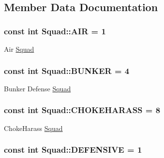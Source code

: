 \subsection{Member Data Documentation}
\hypertarget{class_squad_ad33fd78a46d5a68af5d9b36c2faf2620}{
\subsubsection[{A\-I\-R}]{\setlength{\rightskip}{0pt plus 5cm}const int Squad\-::\-A\-I\-R = 1\hspace{0.3cm}{\ttfamily [static]}}}\label{class_squad_ad33fd78a46d5a68af5d9b36c2faf2620}
Air \hyperlink{class_squad}{Squad} \hypertarget{class_squad_acbf1c634b1d198828b8badb96039c1a0}{
\subsubsection[{B\-U\-N\-K\-E\-R}]{\setlength{\rightskip}{0pt plus 5cm}const int Squad\-::\-B\-U\-N\-K\-E\-R = 4\hspace{0.3cm}{\ttfamily [static]}}}\label{class_squad_acbf1c634b1d198828b8badb96039c1a0}
Bunker Defense \hyperlink{class_squad}{Squad} \hypertarget{class_squad_a296c744bac8fae201bb3f1e9c222907f}{
\subsubsection[{C\-H\-O\-K\-E\-H\-A\-R\-A\-S\-S}]{\setlength{\rightskip}{0pt plus 5cm}const int Squad\-::\-C\-H\-O\-K\-E\-H\-A\-R\-A\-S\-S = 8\hspace{0.3cm}{\ttfamily [static]}}}\label{class_squad_a296c744bac8fae201bb3f1e9c222907f}
Choke\-Harass \hyperlink{class_squad}{Squad} \hypertarget{class_squad_a1c3ca5859f0f3738d609a5f95ba04a6f}{
\subsubsection[{D\-E\-F\-E\-N\-S\-I\-V\-E}]{\setlength{\rightskip}{0pt plus 5cm}const int Squad\-::\-D\-E\-F\-E\-N\-S\-I\-V\-E = 1\hspace{0.3cm}{\ttfamily [static]}}}\label{class_squad_a1c3ca5859f0f3738d609a5f95ba04a6f}
